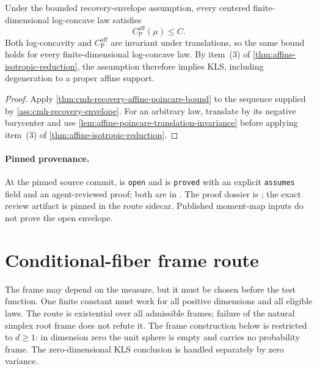 \begin{corollary}
  \label{cor:cmh-recovery-sequence-suffices}
  Under the bounded recovery-envelope assumption, every centered finite-dimensional log-concave
  law satisfies
  \[
    C_{\mathrm P}^{\mathrm{aff}}(\mu)\le C.
  \]
  Both log-concavity and $C_{\mathrm P}^{\mathrm{aff}}$ are invariant under translations, so the
  same bound holds for every finite-dimensional log-concave law.  By item~(3) of
  \cref{thm:affine-isotropic-reduction}, the assumption therefore implies KLS, including
  degeneration to a proper affine support.
\end{corollary}
\begin{proof}
  Apply \cref{thm:cmh-recovery-affine-poincare-bound} to the sequence supplied by
  \cref{ass:cmh-recovery-envelope}.  For an arbitrary law, translate by its negative barycenter
  and use \cref{lem:affine-poincare-translation-invariance} before applying item~(3) of
  \cref{thm:affine-isotropic-reduction}.
\end{proof}

\paragraph{Pinned provenance.}
At the pinned source commit,  is \texttt{open} and
 is
\texttt{proved} with an explicit \texttt{assumes} field and an agent-reviewed proof; both are in
.  The proof dossier is
; the exact review artifact is pinned in the
route sidecar.  Published moment-map inputs do not prove the open envelope.

\section{Conditional-fiber frame route}
\label{route:conditional-fiber-frame}

The frame may depend on the measure, but it must be chosen before the test function.  One finite
constant must work for all positive dimensions and all eligible laws.  The route is existential
over all admissible frames; failure of the natural simplex root frame does not refute it.
The frame construction below is restricted to $d\ge1$: in dimension zero the unit sphere is empty
and carries no probability frame.  The zero-dimensional KLS conclusion is handled separately by
zero variance.

